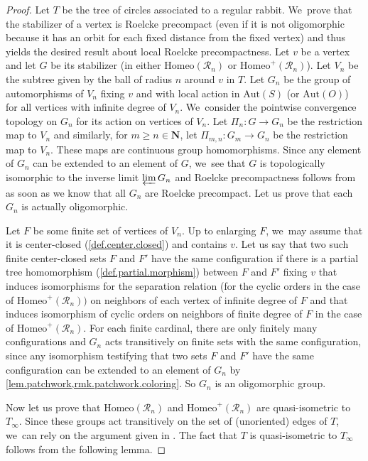 \documentclass[JEP,XML,SOM,Unicode,NoFloatCountersInSection,published]{cedram}
\theoremstyle{plain}
\theoremstyle{definition}
\theoremstyle{remark}
\newcommand{\Aut}{\mathrm{Aut}}
\newcommand{\Homeo}{\mathrm{Homeo}}
\newcommand{\R}{\mathcal{R}}
\begin{document}
\begin{proof}
Let $T$ be the tree of circles associated to a regular rabbit. We~prove that the stabilizer of a vertex is Roelcke precompact (even if it is not oligomorphic because it has an orbit for each fixed distance from the fixed vertex) and thus yields the desired result about local Roelcke precompactness.
Let $v$ be a vertex and let $G$ be its stabilizer (in either $\Homeo(\R_n)$ or $\Homeo^+(\R_n)$).
Let $V_n$ be the subtree given by the ball of radius $n$ around $v$ in $T$.
Let $G_n$ be the group of automorphisms of $V_n$ fixing $v$ and with local action in $\Aut(S)$ (or $\Aut(O)$) for all vertices with infinite degree of $V_n$. We~consider the pointwise convergence topology on $G_n$ for its action on vertices of $V_n$.
Let $\Pi_n\colon G\to G_n$ be the restriction map to $V_n$ and similarly, for $m\geq n\in\mathbf{N}$, let $\Pi_{m,n}\colon G_m\to G_n$ be the restriction map to $V_n$.
These maps are continuous group homomorphisms.
Since any element of $G_n$ can be extended to an element of $G$, we~see that $G$ is topologically isomorphic to the inverse limit $\varprojlim G_n$ and Roelcke precompactness follows from \cite[Prop.\,2.2(iii)]{MR2929072} as soon as we know that all $G_n$ are Roelcke precompact.
Let us prove that each $G_n$ is actually oligomorphic.

Let $F$ be some finite set of vertices of $V_n$.
Up to enlarging $F$, we~may assume that it is center-closed (\cref{def.center.closed}) and contains $v$.
Let us say that two such finite center-closed sets $F$ and $F'$ have the same configuration if there is a partial tree homomorphism (\cref{def.partial.morphism}) between $F$ and $F'$ fixing $v$ that induces isomorphisms for the separation relation (for the cyclic orders in the case of $\Homeo^+(\R_n))$ on neighbors of each vertex of infinite degree of $F$ and that induces isomorphism of cyclic orders on neighbors of finite degree of $F$ in the case of $\Homeo^+(\R_n)$.
For each finite cardinal, there are only finitely many configurations and $G_n$ acts transitively on finite sets with the same configuration, since any isomorphism testifying that two sets $F$ and $F'$ have the same configuration can be extended to an element of $G_n$ by \cref{lem.patchwork,rmk.patchwork.coloring}.
So $G_n$ is an oligomorphic group.\enlargethispage{.5\baselineskip}

Now let us prove that $\Homeo(\R_n)$ and $\Homeo^+(\R_n)$ are quasi-isometric to $T_\infty$.
Since these groups act transitively on the set of (unoriented) edges of $T$, we~can rely on the argument given in \cite[Ex.\,6.34]{MR4327092}.
The fact that $T$ is quasi-isometric to $T_\infty$ follows from the following lemma.
\end{proof}
\end{document}
